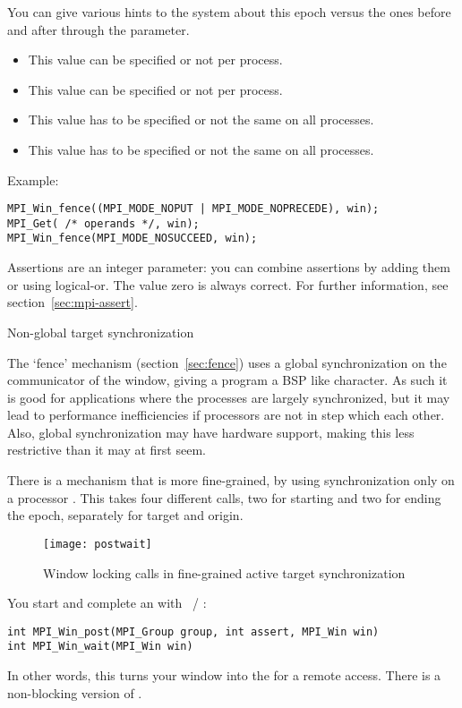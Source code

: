 You can give various hints to the system about this epoch versus the ones
before and after through the  parameter.
\begin{itemize}
\item {}
  This value can be specified or not per process.
\item {}
  This value can be specified or not per process.
\item {}
  This value has to be specified or not the same on all processes.
\item {}
  This value has to be specified or not the same on all processes.
\end{itemize}

Example:
\begin{lstlisting}
MPI_Win_fence((MPI_MODE_NOPUT | MPI_MODE_NOPRECEDE), win);
MPI_Get( /* operands */, win);
MPI_Win_fence(MPI_MODE_NOSUCCEED, win);
\end{lstlisting}

Assertions are an integer parameter: you can combine assertions by
adding them or using logical-or.
The value zero is always correct. For further information, see
section~\ref{sec:mpi-assert}.

 {Non-global target synchronization}
\label{sec:ref:post-wait}

The `fence' mechanism (section~\ref{sec:fence}) uses a global synchronization on the
communicator of the window, giving a program a \ac{BSP} like character.
As such it is good for applications where
the processes are largely synchronized, but it may 
lead to performance inefficiencies if processors are not in step which each other. 
Also, global synchronization may have hardware support, making this less
restrictive than it may at first seem.

There is a mechanism that is more fine-grained, by using synchronization only 
on a processor . This takes four different calls, two for starting
and two for ending the epoch, separately for target and origin.
\begin{figure}[ht]
  \texttt{[image: postwait]}
  \caption{Window locking calls in fine-grained active target synchronization}
  \label{fig:postwait}
\end{figure}

You start and complete an  with
~/ :
\begin{lstlisting}
int MPI_Win_post(MPI_Group group, int assert, MPI_Win win)
int MPI_Win_wait(MPI_Win win)
\end{lstlisting}
In other words, this turns your window into the  for a remote access.
There is a non-blocking version 
of .

